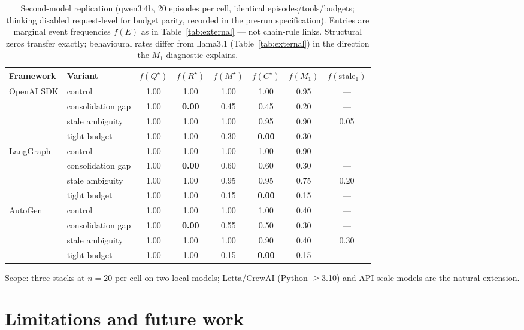 \documentclass{article}
\begin{document}
\begin{table}[h]
\caption{Second-model replication (qwen3:4b, 20 episodes per cell,
identical episodes/tools/budgets; thinking disabled request-level for
budget parity, recorded in the pre-run specification). Entries are marginal
event frequencies $f(E)$ as in Table~\ref{tab:external} --- not
chain-rule links. Structural zeros transfer exactly; behavioural
rates differ from llama3.1 (Table~\ref{tab:external}) in the
direction the $M_1$ diagnostic explains.}
\label{tab:external-qwen}
\centering
\small
\begin{tabular}{llcccccc}
\toprule
Framework & Variant & $f(Q^\star)$ & $f(R^\star)$ & $f(M^\star)$ & $f(C^\star)$ & $f(M_1)$ & $f(\text{stale}_1)$ \\
\midrule
OpenAI SDK & control     & 1.00 & 1.00 & 1.00 & 1.00 & 0.95 & --- \\
           & consolidation gap & 1.00 & \textbf{0.00} & 0.45 & 0.45 & 0.20 & --- \\
           & stale ambiguity   & 1.00 & 1.00 & 1.00 & 0.95 & 0.90 & 0.05 \\
           & tight budget      & 1.00 & 1.00 & 0.30 & \textbf{0.00} & 0.30 & --- \\
\midrule
LangGraph  & control     & 1.00 & 1.00 & 1.00 & 1.00 & 0.90 & --- \\
           & consolidation gap & 1.00 & \textbf{0.00} & 0.60 & 0.60 & 0.30 & --- \\
           & stale ambiguity   & 1.00 & 1.00 & 0.95 & 0.95 & 0.75 & 0.20 \\
           & tight budget      & 1.00 & 1.00 & 0.15 & \textbf{0.00} & 0.15 & --- \\
\midrule
AutoGen    & control     & 1.00 & 1.00 & 1.00 & 1.00 & 0.40 & --- \\
           & consolidation gap & 1.00 & \textbf{0.00} & 0.55 & 0.50 & 0.30 & --- \\
           & stale ambiguity   & 1.00 & 1.00 & 1.00 & 0.90 & 0.40 & 0.30 \\
           & tight budget      & 1.00 & 1.00 & 0.15 & \textbf{0.00} & 0.15 & --- \\
\bottomrule
\end{tabular}
\end{table}

Scope: three stacks at $n{=}20$ per cell on two local models;
Letta/CrewAI (Python $\ge$3.10) and API-scale models are the natural
extension.

\section{Limitations and future work}
\label{sec:limitations}
\end{document}
